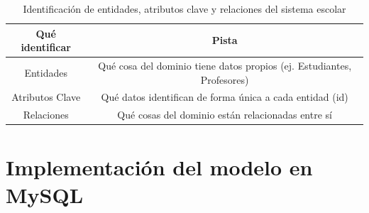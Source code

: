\documentclass{article}
\begin{document}
\begin{table}[H]
\centering
\begin{tabular}{|c|c|}
\hline
\textbf{Qué identificar} & \textbf{Pista} \\ \hline
Entidades & Qué cosa del dominio tiene datos propios (ej. Estudiantes, Profesores) \\ \hline
Atributos Clave & Qué datos identifican de forma única a cada entidad (id) \\ \hline
Relaciones & Qué cosas del dominio están relacionadas entre sí \\ \hline
\end{tabular}
\caption{Identificación de entidades, atributos clave y relaciones del sistema escolar}
\end{table}

\section{Implementación del modelo en MySQL}
\blindtext
\end{document}
